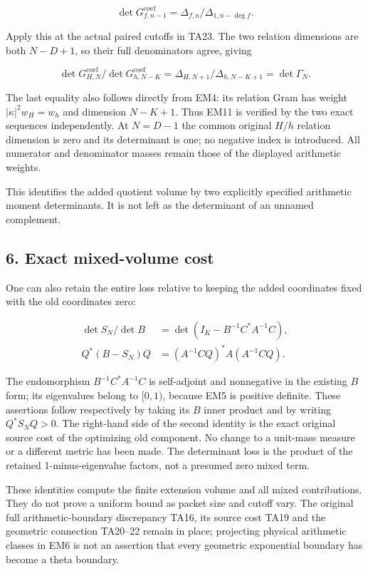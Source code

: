 \[
\det G_{f,n-1}^{\mathrm{coef}}=\Delta_{f,n}/\Delta_{1,n-\deg f}.
\]

Apply this at the actual paired cutoffs in TA23. The two relation
dimensions are both \(N-D+1\), so their full denominators agree, giving

\[
\det G_{H,N}^{\mathrm{coef}}/\det G_{h,N-K}^{\mathrm{coef}}=\Delta_{H,N+1}/\Delta_{h,N-K+1}=\det\Gamma_N.\tag{EM11}
\]

The last equality also follows directly from EM4: its relation Gram
has weight \(|\kappa|^2w_H=w_h\) and dimension \(N-K+1\). Thus EM11 is verified
by the two exact sequences independently. At \(N=D-1\) the common original
\(H/h\) relation dimension is zero and its determinant is one; no negative
index is introduced. All numerator and denominator masses remain those
of the displayed arithmetic weights.

This identifies the added quotient volume by two explicitly specified
arithmetic moment determinants. It is not left as the determinant of
an unnamed complement.

\subsection{6. Exact mixed-volume cost}\label{EM-exact-mixed-volume-cost}

One can also retain the entire loss relative to keeping the added
coordinates fixed with the old coordinates zero:

\[
\begin{aligned}\det S_N/\det B&=\det(I_K-B^{-1}C^*A^{-1}C),\\Q^*(B-S_N)Q&=(A^{-1}CQ)^*A(A^{-1}CQ).\end{aligned}\tag{EM12}
\]

The endomorphism \(B^{-1}C^*A^{-1}C\) is self-adjoint and nonnegative in
the existing \(B\) form; its eigenvalues belong to \([0,1)\), because EM5 is
positive definite. These assertions follow respectively by taking its
\(B\) inner product and by writing \(Q^*S_NQ>0\). The right-hand side of
the second identity is the exact original source cost of the optimizing
old component. No change to a unit-mass measure or a different metric
has been made. The determinant loss is the product of the retained
1-minus-eigenvalue factors, not a presumed zero mixed term.

These identities compute the finite extension volume and all mixed
contributions. They do not prove a uniform bound as packet size and
cutoff vary. The original full arithmetic-boundary discrepancy TA16,
its source cost TA19 and the geometric connection TA20--22 remain in
place; projecting physical arithmetic classes in EM6 is not an assertion
that every geometric exponential boundary has become a theta boundary.

